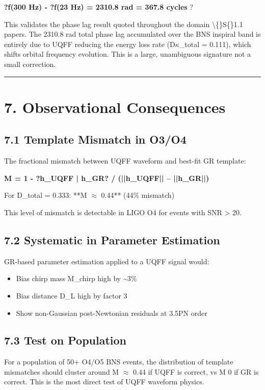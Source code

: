 \documentclass[11pt]{article}
\begin{document}
\textbf{?f(300 Hz) - ?f(23 Hz) = 2310.8 rad = 367.8 cycles} ?

This validates the phase lag result quoted throughout the domain \textbackslash\{\}S\{\}1.1 papers. The 2310.8 rad total phase lag accumulated over the BNS inspiral band is entirely due to UQFF reducing the energy loss rate (D$\kappa$\_total = 0.111), which shifts orbital frequency evolution. This is a large, unambiguous signature  not a small correction.

\noindent\rule{\textwidth}{0.4pt}

\section*{7. Observational Consequences}

\subsection*{7.1 Template Mismatch in O3/O4}

The fractional mismatch between UQFF waveform and best-fit GR template:

\textbf{M = 1 - ?h\_UQFF | h\_GR? / (||h\_UQFF|| -- ||h\_GR||)}

For D\_total = 0.333: **M $\approx$ 0.44** (44\% mismatch)

This level of mismatch is detectable in LIGO O4 for events with SNR > 20.

\subsection*{7.2 Systematic in Parameter Estimation}

GR-based parameter estimation applied to a UQFF signal would:

\begin{itemize}
  \item Bias chirp mass M\_chirp high by \textasciitilde{}3\%
  \item Bias distance D\_L high by factor 3
  \item Show non-Gaussian post-Newtonian residuals at 3.5PN order
\end{itemize}

\subsection*{7.3 Test on Population}

For a population of 50+ O4/O5 BNS events, the distribution of template mismatches should cluster around M $\approx$ 0.44 if UQFF is correct, vs M  0 if GR is correct. This is the most direct test of UQFF waveform physics.
\end{document}
